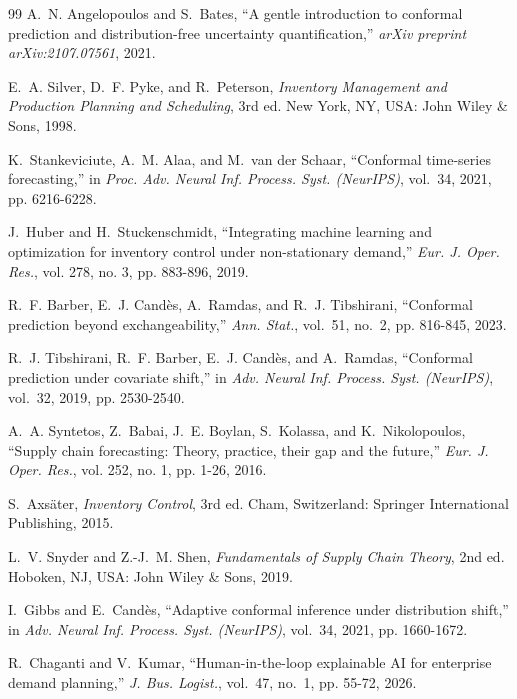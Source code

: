 \documentclass[11pt,a4paper]{article}
\begin{document}
\begin{thebibliography}{99}
A.~N. Angelopoulos and S.~Bates, ``A gentle introduction to conformal prediction and distribution-free uncertainty quantification,'' \emph{arXiv preprint arXiv:2107.07561}, 2021.

E.~A. Silver, D.~F. Pyke, and R.~Peterson, \emph{Inventory Management and Production Planning and Scheduling}, 3rd ed. New York, NY, USA: John Wiley \& Sons, 1998.

K.~Stankeviciute, A.~M. Alaa, and M.~van der Schaar, ``Conformal time-series forecasting,'' in \emph{Proc. Adv. Neural Inf. Process. Syst. (NeurIPS)}, vol.~34, 2021, pp. 6216-6228.

J.~Huber and H.~Stuckenschmidt, ``Integrating machine learning and optimization for inventory control under non-stationary demand,'' \emph{Eur. J. Oper. Res.}, vol. 278, no. 3, pp. 883-896, 2019.

R.~F. Barber, E.~J. Cand{\`e}s, A.~Ramdas, and R.~J. Tibshirani, ``Conformal prediction beyond exchangeability,'' \emph{Ann. Stat.}, vol.~51, no.~2, pp. 816-845, 2023.

R.~J. Tibshirani, R.~F. Barber, E.~J. Cand{\`e}s, and A.~Ramdas, ``Conformal prediction under covariate shift,'' in \emph{Adv. Neural Inf. Process. Syst. (NeurIPS)}, vol.~32, 2019, pp. 2530-2540.

A.~A. Syntetos, Z.~Babai, J.~E. Boylan, S.~Kolassa, and K.~Nikolopoulos, ``Supply chain forecasting: Theory, practice, their gap and the future,'' \emph{Eur. J. Oper. Res.}, vol. 252, no. 1, pp. 1-26, 2016.

S.~Axs{\"a}ter, \emph{Inventory Control}, 3rd ed. Cham, Switzerland: Springer International Publishing, 2015.

L.~V. Snyder and Z.-J.~M. Shen, \emph{Fundamentals of Supply Chain Theory}, 2nd ed. Hoboken, NJ, USA: John Wiley \& Sons, 2019.

I.~Gibbs and E.~Cand{\`e}s, ``Adaptive conformal inference under distribution shift,'' in \emph{Adv. Neural Inf. Process. Syst. (NeurIPS)}, vol.~34, 2021, pp. 1660-1672.

R.~Chaganti and V.~Kumar, ``Human-in-the-loop explainable AI for enterprise demand planning,'' \emph{J. Bus. Logist.}, vol.~47, no.~1, pp. 55-72, 2026.


\end{thebibliography}
\end{document}
